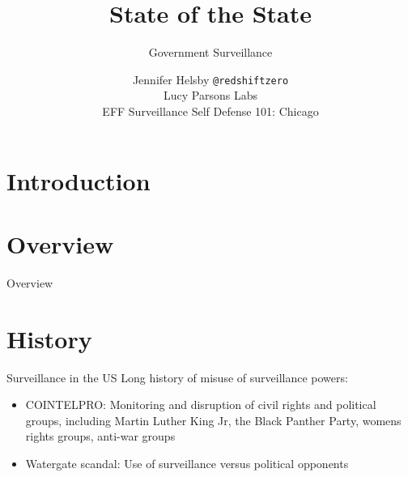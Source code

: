 \documentclass[newPxFont]{beamer}
\title{State of the State}
\subtitle{Government Surveillance}
\author{Jennifer Helsby \texttt{@redshiftzero}\\
        Lucy Parsons Labs\\
        EFF Surveillance Self Defense 101: Chicago}
\begin{document}
%
%

\maketitle


%
%

\section*{Introduction}

\section*{Overview}
\begin{frame}{Overview}
\tableofcontents[hideallsubsections]
\end{frame}

%
%

\section{History}

\begin{frame}{Surveillance in the US}
Long history of misuse of surveillance powers:
\begin{itemize}
\item<1-> COINTELPRO: Monitoring and disruption of civil rights and political groups, including Martin Luther King Jr, the Black Panther Party, womens rights groups, anti-war groups
\item<2-> Watergate scandal: Use of surveillance versus political opponents 
\end{itemize}
\end{frame}
\end{document}
